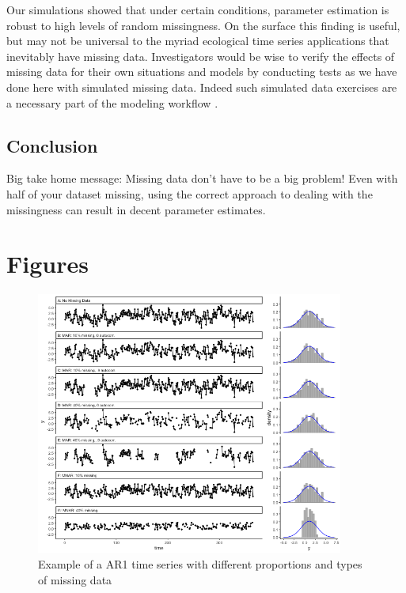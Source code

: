 \documentclass{article}
\begin{document}


Our simulations showed that under certain conditions, parameter estimation is robust to high levels of random missingness.  On the surface this finding is useful, but may not be universal to the myriad ecological time series applications that inevitably have missing data. Investigators would be wise to verify the effects of missing data for their own situations and models by conducting tests as we have done here with simulated missing data. Indeed such simulated data exercises are a necessary part of the modeling workflow \citep{gelman2020bayesian}.  

\subsection{Conclusion}
Big take home message: Missing data don't have to be a big problem! Even with half of your dataset missing, using the correct approach to dealing with the missingness can result in decent parameter estimates.    


\newpage


\section*{Figures}

\begin{figure}[h]
    \noindent\includegraphics[width = 0.9\textwidth]{Figures/CompareMissingnessTypes_fig.png}
    \caption{Example of a AR1 time series with different proportions and types of missing data}
    \label{fig:missingtypes}
\end{figure}
\end{document}
